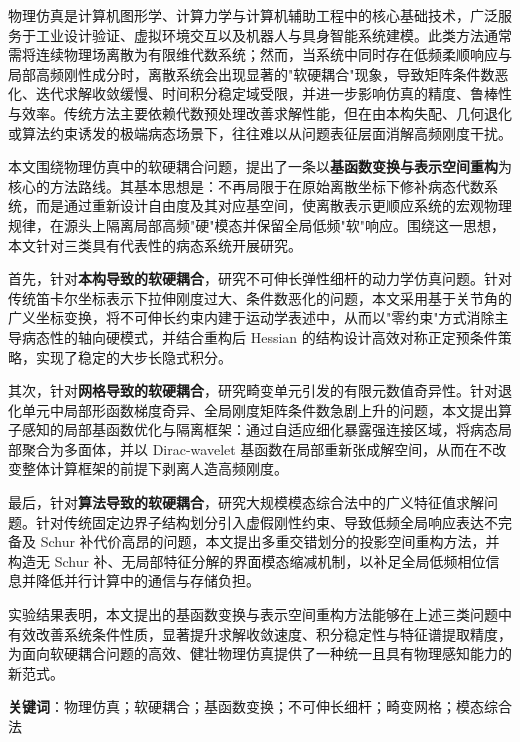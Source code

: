 \cleardoublepage
{}

物理仿真是计算机图形学、计算力学与计算机辅助工程中的核心基础技术，广泛服务于工业设计验证、虚拟环境交互以及机器人与具身智能系统建模。此类方法通常需将连续物理场离散为有限维代数系统；然而，当系统中同时存在低频柔顺响应与局部高频刚性成分时，离散系统会出现显著的"软硬耦合"现象，导致矩阵条件数恶化、迭代求解收敛缓慢、时间积分稳定域受限，并进一步影响仿真的精度、鲁棒性与效率。传统方法主要依赖代数预处理改善求解性能，但在由本构失配、几何退化或算法约束诱发的极端病态场景下，往往难以从问题表征层面消解高频刚度干扰。

本文围绕物理仿真中的软硬耦合问题，提出了一条以\textbf{基函数变换与表示空间重构}为核心的方法路线。其基本思想是：不再局限于在原始离散坐标下修补病态代数系统，而是通过重新设计自由度及其对应基空间，使离散表示更顺应系统的宏观物理规律，在源头上隔离局部高频"硬"模态并保留全局低频"软"响应。围绕这一思想，本文针对三类具有代表性的病态系统开展研究。

首先，针对\textbf{本构导致的软硬耦合}，研究不可伸长弹性细杆的动力学仿真问题。针对传统笛卡尔坐标表示下拉伸刚度过大、条件数恶化的问题，本文采用基于关节角的广义坐标变换，将不可伸长约束内建于运动学表述中，从而以"零约束"方式消除主导病态性的轴向硬模式，并结合重构后 Hessian 的结构设计高效对称正定预条件策略，实现了稳定的大步长隐式积分。

其次，针对\textbf{网格导致的软硬耦合}，研究畸变单元引发的有限元数值奇异性。针对退化单元中局部形函数梯度奇异、全局刚度矩阵条件数急剧上升的问题，本文提出算子感知的局部基函数优化与隔离框架：通过自适应细化暴露强连接区域，将病态局部聚合为多面体，并以 Dirac-wavelet 基函数在局部重新张成解空间，从而在不改变整体计算框架的前提下剥离人造高频刚度。

最后，针对\textbf{算法导致的软硬耦合}，研究大规模模态综合法中的广义特征值求解问题。针对传统固定边界子结构划分引入虚假刚性约束、导致低频全局响应表达不完备及 Schur 补代价高昂的问题，本文提出多重交错划分的投影空间重构方法，并构造无 Schur 补、无局部特征分解的界面模态缩减机制，以补足全局低频相位信息并降低并行计算中的通信与存储负担。

实验结果表明，本文提出的基函数变换与表示空间重构方法能够在上述三类问题中有效改善系统条件性质，显著提升求解收敛速度、积分稳定性与特征谱提取精度，为面向软硬耦合问题的高效、健壮物理仿真提供了一种统一且具有物理感知能力的新范式。

\bigskip
\noindent \textbf{关键词}：物理仿真；软硬耦合；基函数变换；不可伸长细杆；畸变网格；模态综合法

\cleardoublepage
{}

